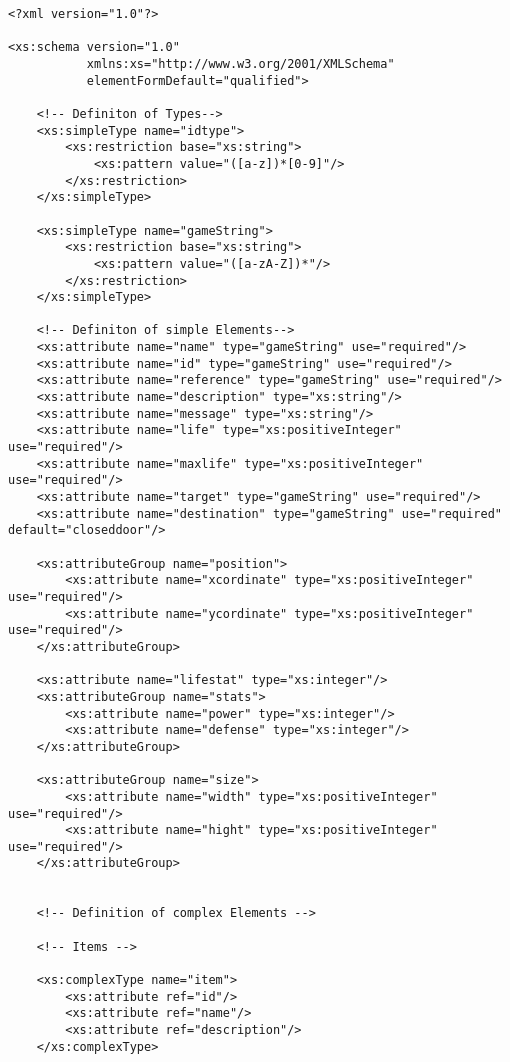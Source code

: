 \begin{lstlisting}
<?xml version="1.0"?>

<xs:schema version="1.0"
           xmlns:xs="http://www.w3.org/2001/XMLSchema"
           elementFormDefault="qualified">

    <!-- Definiton of Types-->   
    <xs:simpleType name="idtype">
        <xs:restriction base="xs:string">
            <xs:pattern value="([a-z])*[0-9]"/>
        </xs:restriction>
    </xs:simpleType>
    
    <xs:simpleType name="gameString">
        <xs:restriction base="xs:string">
            <xs:pattern value="([a-zA-Z])*"/>
        </xs:restriction>
    </xs:simpleType>
    
    <!-- Definiton of simple Elements-->
    <xs:attribute name="name" type="gameString" use="required"/>
    <xs:attribute name="id" type="gameString" use="required"/>
    <xs:attribute name="reference" type="gameString" use="required"/>
    <xs:attribute name="description" type="xs:string"/>
    <xs:attribute name="message" type="xs:string"/>
    <xs:attribute name="life" type="xs:positiveInteger" use="required"/>
    <xs:attribute name="maxlife" type="xs:positiveInteger" use="required"/>
    <xs:attribute name="target" type="gameString" use="required"/>
    <xs:attribute name="destination" type="gameString" use="required" default="closeddoor"/>
    
    <xs:attributeGroup name="position">
        <xs:attribute name="xcordinate" type="xs:positiveInteger" use="required"/>
        <xs:attribute name="ycordinate" type="xs:positiveInteger" use="required"/>
    </xs:attributeGroup>
    
    <xs:attribute name="lifestat" type="xs:integer"/>
    <xs:attributeGroup name="stats">
        <xs:attribute name="power" type="xs:integer"/>
        <xs:attribute name="defense" type="xs:integer"/>
    </xs:attributeGroup>
    
    <xs:attributeGroup name="size">
        <xs:attribute name="width" type="xs:positiveInteger" use="required"/>
        <xs:attribute name="hight" type="xs:positiveInteger" use="required"/>
    </xs:attributeGroup>
    

    <!-- Definition of complex Elements -->
    
    <!-- Items -->
     
    <xs:complexType name="item">
        <xs:attribute ref="id"/>
        <xs:attribute ref="name"/>
        <xs:attribute ref="description"/>                
    </xs:complexType>


\end{lstlisting}

